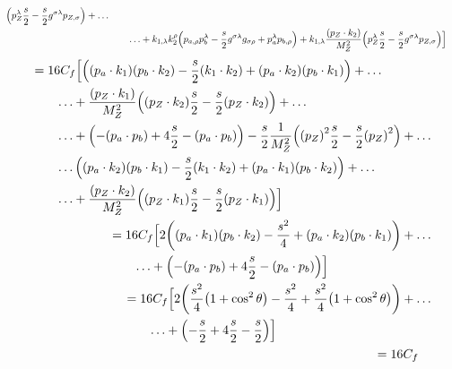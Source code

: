 \documentclass[12 pt,draft]{article}
\renewcommand{\b}[1]{\overline{#1}}
\begin{document}
\begin{problem}[ $\mu\b{\mu}\rightarrow f\b{f}$]
\begin{align}
\begin{split}
					\qty(p_{Z}^{\lambda}\oo[s]{2}
						-\oo[s]{2}g^{\sigma\lambda}p_{Z,\sigma})
					+\ldots\\&\qquad\ldots+
					k_{1,\lambda}k_{2}^{\rho}
					\qty(p_{a,\rho}p_{b}^{\lambda}
						-\oo[s]{2}g^{\sigma\lambda}g_{\sigma\rho}
						+p_{a}^{\lambda}p_{b,\rho})
					+k_{1,\lambda}\frac{\qty(p_Z\cdot k_2) }{M_Z^2}
					\qty(p_{Z}^{\lambda}\oo[s]{2}
						-\oo[s]{2}g^{\sigma\lambda}p_{Z,\sigma})
				\Big]
			\end{split}
		\end{align}
		\begin{align}
			\begin{split}
				&=16C_f
				\Big[
					\qty(\qty(p_a\cdot k_1)\qty(p_b\cdot k_2)
						-\oo[s]{2}\qty(k_1\cdot k_2)
						+\qty(p_a\cdot k_2)\qty(p_b\cdot k_1))
					+\ldots\\&\qquad\ldots
					+\frac{\qty(p_Z\cdot k_1) }{M_Z^2}
					\qty(\qty(p_Z\cdot k_2)\oo[s]{2}
						-\oo[s]{2}\qty(p_Z\cdot k_2))
					+\ldots\\&\qquad\ldots
					+\qty(-\qty(p_a\cdot p_b)
						+4\oo[s]{2}
						-\qty(p_a\cdot p_b))
					-\oo[s]{2}\oo{M_Z^2}
					\qty(\qty(p_{Z})^2\oo[s]{2}
						-\oo[s]{2}\qty(p_Z)^2)
					+\ldots\\&\qquad\ldots
					\qty(\qty(p_a\cdot k_2)\qty(p_b\cdot k_1)
						-\oo[s]{2}\qty(k_1\cdot k_2)
						+\qty(p_a\cdot k_1)\qty(p_b\cdot k_2))
					+\ldots\\&\qquad\ldots
					+\frac{\qty(p_Z\cdot k_2) }{M_Z^2}
					\qty(\qty(p_Z\cdot k_1) \oo[s]{2}
						-\oo[s]{2}\qty(p_Z\cdot k_1))
				\Big]
			\end{split}
			\\
			\begin{split}
				&=16C_f
				\Big[
					2\qty(\qty(p_a\cdot k_1)\qty(p_b\cdot k_2)-\oo[s^2]{4}
						+\qty(p_a\cdot k_2)\qty(p_b\cdot k_1))
					+\ldots\\&\qquad\ldots
					+\qty(-\qty(p_a\cdot p_b)+4\oo[s]{2}-\qty(p_a\cdot p_b))
				\Big]
			\end{split}
			\\
			\begin{split}
				&=16C_f
				\Big[
					2\qty(\oo[s^2]{4}\qty(1+\cos^2\theta)-\oo[s^2]{4}
						+\oo[s^2]{4}\qty(1+\cos^2\theta))
					+\ldots\\&\qquad\ldots
					+\qty(-\oo[s]{2}+4\oo[s]{2}-\oo[s]{2})
				\Big]
			\end{split}
			\\
			\begin{split}
				&=16C_f

\end{split}
\end{align}
\end{problem}
\end{document}
